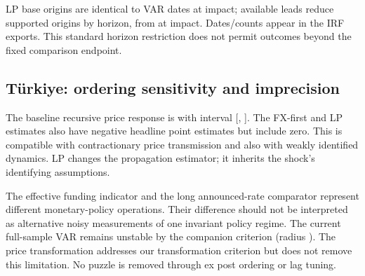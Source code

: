 LP base origins are identical to VAR dates at impact; available leads reduce supported origins by horizon, from \ComparisonN{} at impact. Dates/counts appear in the IRF exports. This standard horizon restriction does not permit outcomes beyond the fixed comparison endpoint.
\subsection{Türkiye: ordering sensitivity and imprecision}

The baseline recursive price response is \TRPricePoint{} with interval [\TRPriceLow{}, \TRPriceHigh{}]. The FX-first and LP estimates also have negative headline point estimates but include zero. This is compatible with contractionary price transmission and also with weakly identified dynamics. LP changes the propagation estimator; it inherits the shock's identifying assumptions.

The effective funding indicator and the long announced-rate comparator represent different monetary-policy operations. Their difference should not be interpreted as alternative noisy measurements of one invariant policy regime. The current full-sample VAR remains unstable by the companion criterion (radius \TRRadius{}). The price transformation addresses our transformation criterion but does not remove this limitation. No puzzle is removed through ex post ordering or lag tuning.
